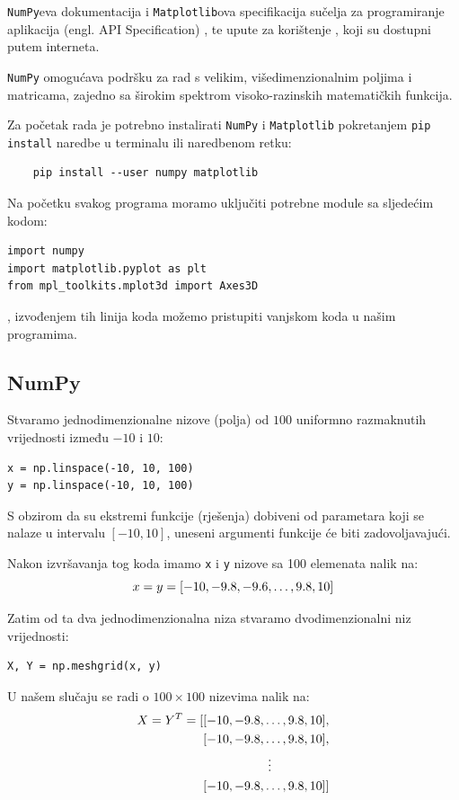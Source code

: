 \verb|NumPy|eva dokumentacija\cite{numpy_doc} i \verb|Matplotlib|ova specifikacija sučelja za programiranje aplikacija (engl. API Specification) \cite{mpl_api}, te upute za korištenje \cite{mpl_ug}, koji su dostupni putem interneta.

\verb|NumPy| omogućava podršku za rad s velikim, višedimenzionalnim poljima i matricama, zajedno sa širokim spektrom visoko-razinskih matematičkih funkcija.\par

Za početak rada je potrebno instalirati \verb|NumPy| i \verb|Matplotlib| pokretanjem \verb|pip install| naredbe u terminalu ili naredbenom retku:
\begin{verbatim}
    pip install --user numpy matplotlib
\end{verbatim}

Na početku svakog programa moramo uključiti potrebne module sa sljedećim kodom\cite[][naslov 5.4.2. Submodules]{py_lang_ref}:
\begin{verbatim}
import numpy
import matplotlib.pyplot as plt
from mpl_toolkits.mplot3d import Axes3D
\end{verbatim}
, izvođenjem tih linija koda možemo pristupiti vanjskom koda u našim programima.

\subsection{NumPy}

Stvaramo jednodimenzionalne nizove (polja) od $100$ uniformno razmaknutih vrijednosti između $-10$ i $10$:
\begin{verbatim}
x = np.linspace(-10, 10, 100)
y = np.linspace(-10, 10, 100)
\end{verbatim}
S obzirom da su ekstremi funkcije (rješenja) dobiveni od parametara koji se nalaze u intervalu $[-10, 10]$, uneseni argumenti funkcije će biti zadovoljavajući.\par
Nakon izvršavanja tog koda imamo \verb|x| i \verb|y| nizove sa 100 elemenata nalik na:
$$
    x = y = [-10,\space-9.8,\space-9.6,\dots,\space9.8,\space10]
$$

Zatim od ta dva jednodimenzionalna niza stvaramo dvodimenzionalni niz vrijednosti:
\begin{verbatim}
X, Y = np.meshgrid(x, y)
\end{verbatim}
U našem slučaju se radi o $100\times100$ nizevima nalik na:
\begin{align*}
    X = Y^T = [&[-10,\space-9.8,\dots,\space9.8,\space10],\\
    &[-10,\space-9.8,\dots,\space9.8,\space10],\\
    &\hspace*{0.15\linewidth}\vdots\\
    &[-10,\space-9.8,\dots,\space9.8,\space10]]
\end{align*}

